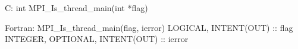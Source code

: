 C:
int MPI_Is_thread_main(int *flag)

Fortran:
MPI_Is_thread_main(flag, ierror)
LOGICAL, INTENT(OUT) :: flag
INTEGER, OPTIONAL, INTENT(OUT) :: ierror
